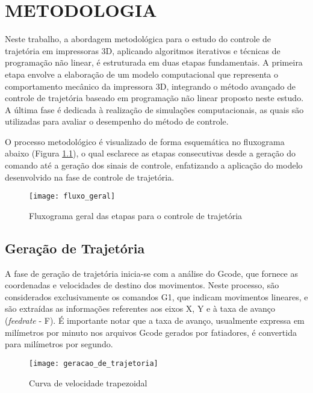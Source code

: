 \chapter{METODOLOGIA}
Neste trabalho, a abordagem metodológica para o estudo do controle de trajetória em impressoras 3D, aplicando algoritmos iterativos e técnicas de programação não linear, é estruturada em duas etapas fundamentais. A primeira etapa envolve a elaboração de um modelo computacional que representa o comportamento mecânico da impressora 3D, integrando o método avançado de controle de trajetória baseado em programação não linear proposto neste estudo. A última fase é dedicada à realização de simulações computacionais, as quais são utilizadas para avaliar o desempenho do método de controle.

O processo metodológico é visualizado de forma esquemática no fluxograma abaixo (Figura \ref{fig:fluxo_geral}), o qual esclarece as etapas consecutivas desde a geração do comando até a geração dos sinais de controle, enfatizando a aplicação do modelo desenvolvido na fase de controle de trajetória.

\begin{figure}[H]
    \centering
    \caption{Fluxograma geral das etapas para o controle de trajetória}
    \texttt{[image: fluxo\_geral]}

    \label{fig:fluxo_geral}
\end{figure}

\section{Geração de Trajetória}

A fase de geração de trajetória inicia-se com a análise do Gcode, que fornece as coordenadas e velocidades de destino dos movimentos. Neste processo, são considerados exclusivamente os comandos G1, que indicam movimentos lineares, e são extraídas as informações referentes aos eixos X, Y e à taxa de avanço (\textit{feedrate} - F). É importante notar que a taxa de avanço, usualmente expressa em milímetros por minuto nos arquivos Gcode gerados por fatiadores, é convertida para milímetros por segundo.

\begin{figure}[H]
    \centering
    \caption{Curva de velocidade trapezoidal}
    \texttt{[image: geracao\_de\_trajetoria]}

    \label{fig:geracao_de_trajetoria}
\end{figure}

